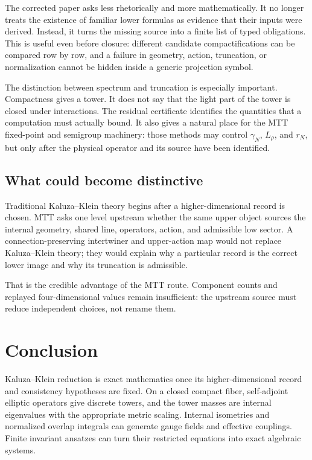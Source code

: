 \documentclass[11pt]{article}
\theoremstyle{definition}
\theoremstyle{remark}
\begin{document}
The corrected paper asks less rhetorically and more mathematically.  It no
longer treats the existence of familiar lower formulas as evidence that
their inputs were derived.  Instead, it turns the missing source into a
finite list of typed obligations.  This is useful even before closure:
different candidate compactifications can be compared row by row, and a
failure in geometry, action, truncation, or normalization cannot be hidden
inside a generic projection symbol.

The distinction between spectrum and truncation is especially important.
Compactness gives a tower.  It does not say that the light part of the tower
is closed under interactions.  The residual certificate identifies the
quantities that a computation must actually bound.  It also gives a natural
place for the MTT fixed-point and semigroup machinery: those methods may
control \(\gamma_N\), \(L_\rho\), and \(r_N\), but only after the physical
operator and its source have been identified.

\subsection{What could become distinctive}

Traditional Kaluza--Klein theory begins after a higher-dimensional record is
chosen.  MTT asks one level upstream whether the same upper object sources
the internal geometry, shared line, operators, action, and admissible low
sector.  A connection-preserving intertwiner and upper-action map would not
replace Kaluza--Klein theory; they would explain why a particular record is
the correct lower image and why its truncation is admissible.

That is the credible advantage of the MTT route.  Component counts and
replayed four-dimensional values remain insufficient: the upstream source
must reduce independent choices, not rename them.

\section{Conclusion}

Kaluza--Klein reduction is exact mathematics once its higher-dimensional
record and consistency hypotheses are fixed.  On a closed compact fiber,
self-adjoint elliptic operators give discrete towers, and the tower masses
are internal eigenvalues with the appropriate metric scaling.  Internal
isometries and normalized overlap integrals can generate gauge fields and
effective couplings.  Finite invariant ansatzes can turn their restricted
equations into exact algebraic systems.
\end{document}
